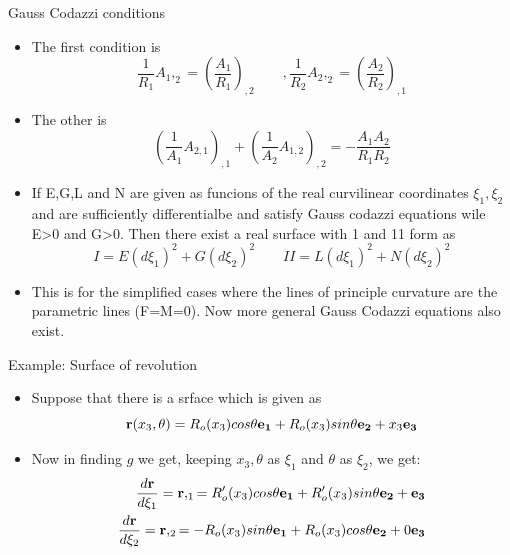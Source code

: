 	\begin{frame}{Gauss Codazzi conditions}
		\begin{itemize}
			\item The first condition is 
			\begin{equation}
			\frac{1}{R_1}A_1,_2 = \left(\frac{A_1}{R_1} \right)_{,2} \qquad,
			\frac{1}{R_2}A_2,_2 = \left(\frac{A_2}{R_2} \right)_{,1}
			\end{equation}
			\item The other is
			\begin{equation}
			\left(\frac{1}{A_1}A_{2,1} \right)_{,1}
			+
			\left(\frac{1}{A_2}A_{1,2} \right)_{,2} 
			= -\frac{A_1A_2}{R_1R_2}
			\end{equation}
			\item If E,G,L and N are given as funcions of the real curvilinear coordinates $\xi_1,\xi_2$ and are sufficiently differentialbe and satisfy Gauss codazzi equations wile E>0 and G>0. Then there exist a real surface with 1 and 11 form as
			\begin{equation}
			I = E(d\xi_1)^2 + G(d\xi_2)^2 \qquad II =  L(d\xi_1)^2 + N(d\xi_2)^2 
			\end{equation}
			\item This is for the simplified cases where the lines of principle curvature are the parametric lines (F=M=0). Now more general Gauss Codazzi equations also exist.
		\end{itemize}
	\end{frame}


	\begin{frame}{Example: Surface of revolution}
		\begin{itemize}
			\item Suppose that there is a srface which is given as 
			\begin{equation}
			\mathbf{r}(x_3,\theta) = R_o(x_3)cos\theta \mathbf{e_1} + R_o(x_3)sin\theta \mathbf{e_2} + x_3\mathbf{e_3}
			\end{equation}
			\item Now in finding $g$ we get, keeping $x_3,\theta$ as $\xi_1$ and $\theta$ as $\xi_2$, we get:
			\begin{equation}
			\begin{aligned}
			\frac{d \mathbf{r}}{d\xi_1} = \mathbf{r},_1 = R_o'(x_3)cos\theta \mathbf{e_1} + R_o'(x_3)sin\theta \mathbf{e_2} + \mathbf{e_3} \\ 
			\frac{d \mathbf{r}}{d\xi_2} = \mathbf{r},_2 = -R_o(x_3)sin\theta \mathbf{e_1} + R_o(x_3)cos\theta \mathbf{e_2} + 0\mathbf{e_3} \\ 
			\end{aligned}
			\end{equation}
		\end{itemize}
	\end{frame}


